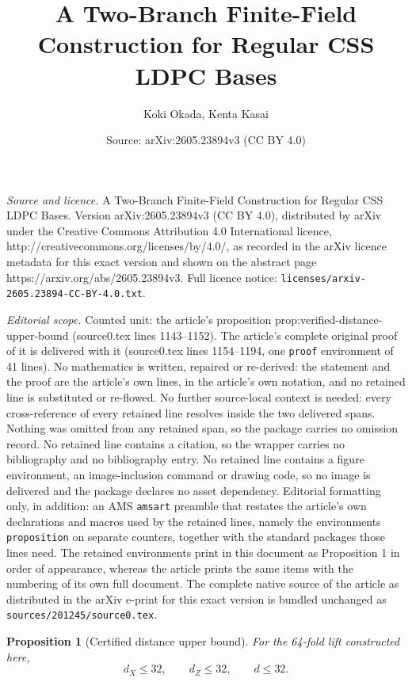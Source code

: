 \documentclass[10pt,a4paper]{amsart}
\title{A Two-Branch Finite-Field Construction for Regular CSS LDPC Bases}
\author{Koki Okada, Kenta Kasai}
\date{Source: arXiv:2605.23894v3 (CC BY 4.0)}
\newtheorem{proposition}{Proposition}
\begin{document}
\maketitle

\noindent\emph{Source and licence.} A Two-Branch Finite-Field Construction for Regular CSS LDPC Bases. Version arXiv:2605.23894v3 (CC BY 4.0), distributed by arXiv under the Creative Commons Attribution 4.0 International licence, http://creativecommons.org/licenses/by/4.0/, as recorded in the arXiv licence metadata for this exact version and shown on the abstract page https://arxiv.org/abs/2605.23894v3. Full licence notice: \texttt{licenses/arxiv-2605.23894-CC-BY-4.0.txt}.\par\smallskip

\noindent\textit{Editorial scope.} Counted unit: the article's proposition prop:verified-distance-upper-bound (source0.tex lines 1143--1152). The article's complete original proof of it is delivered with it (source0.tex lines 1154--1194, one \texttt{proof} environment of 41 lines). No mathematics is written, repaired or re-derived: the statement and the proof are the article's own lines, in the article's own notation, and no retained line is substituted or re-flowed.  No further source-local context is needed: every cross-reference of every retained line resolves inside the two delivered spans.  Nothing was omitted from any retained span, so the package carries no omission record.  No retained line contains a citation, so the wrapper carries no bibliography and no bibliography entry.  No retained line contains a figure environment, an image-inclusion command or drawing code, so no image is delivered and the package declares no asset dependency.  Editorial formatting only, in addition: an AMS \texttt{amsart} preamble that restates the article's own declarations and macros used by the retained lines, namely the environments \texttt{proposition} on separate counters, together with the standard packages those lines need.  The retained environments print in this document as Proposition 1 in order of appearance, whereas the article prints the same items with the numbering of its own full document.  The complete native source of the article as distributed in the arXiv e-print for this exact version is bundled unchanged as \texttt{sources/201245/source0.tex}.
\begin{proposition}[Certified distance upper bound]\label{prop:verified-distance-upper-bound}
For the 64-fold lift constructed here,
\[
  d_X \le 32,
  \qquad
  d_Z \le 32,
  \qquad
  d \le 32.
\]
\end{proposition}
\end{document}
